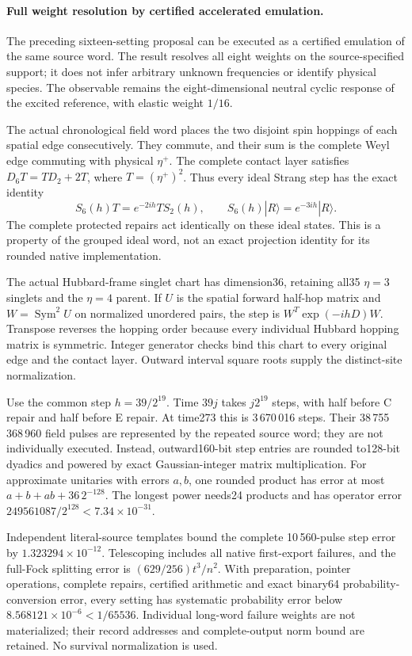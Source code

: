 \paragraph{Full weight resolution by certified accelerated emulation.}
The preceding sixteen-setting proposal can be executed as a certified
emulation of the same source word.  The result resolves all eight weights
on the source-specified support; it does not infer arbitrary unknown
frequencies or identify physical species.  The observable remains the
eight-dimensional neutral cyclic response of the excited reference,
with elastic weight $1/16$.

The actual chronological field word places the two disjoint spin hoppings
of each spatial edge consecutively.  They commute, and their sum is the
complete Weyl edge commuting with physical $\eta^+$.  The complete contact
layer satisfies $D_6T=T D_2+2T$, where $T=(\eta^+)^2$.  Thus every ideal
Strang step has the exact identity
\[
 S_6(h)T=e^{-2ih}T S_2(h),\qquad
 S_6(h)|R\rangle=e^{-3ih}|R\rangle.
\]
The complete protected repairs act identically on these ideal states.
This is a property of the grouped ideal word, not an exact projection
identity for its rounded native implementation.

The actual Hubbard-frame singlet chart has dimension36, retaining all35
$\eta=3$ singlets and the $\eta=4$ parent.  If $U$ is the spatial forward
half-hop matrix and $W=\operatorname{Sym}^2U$ on normalized unordered pairs,
the step is $W^T\exp(-ihD)W$.  Transpose reverses the hopping order because
every individual Hubbard hopping matrix is symmetric.  Integer generator
checks bind this chart to every original edge and the contact layer.
Outward interval square roots supply the distinct-site normalization.

Use the common step $h=39/2^{19}$.  Time $39j$ takes $j2^{19}$ steps,
with half before C repair and half before E repair.  At time273 this is
3\,670\,016 steps.  Their 38\,755\,368\,960 field pulses are represented
by the repeated source word; they are not individually executed.
Instead, outward160-bit step entries are rounded to128-bit dyadics and
powered by exact Gaussian-integer matrix multiplication.  For approximate
unitaries with errors $a,b$, one rounded product has error at most
$a+b+ab+36\,2^{-128}$.  The longest power needs24 products and has operator
error $249561087/2^{128}<7.34\times10^{-31}$.

Independent literal-source templates bound the complete 10\,560-pulse
step error by $1.323294\times10^{-12}$.  Telescoping includes all native
first-export failures, and the full-Fock splitting error is
$(629/256)t^3/n^2$.  With preparation, pointer operations, complete repairs,
certified arithmetic and exact binary64 probability-conversion error,
every setting has systematic probability error below
$8.568121\times10^{-6}<1/65536$.  Individual long-word failure weights are
not materialized; their record addresses and complete-output norm bound
are retained.  No survival normalization is used.

